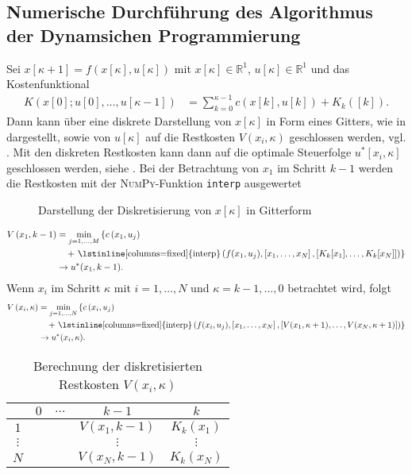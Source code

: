 \subsection{Numerische Durchführung des Algorithmus der Dynamsichen Programmierung}
Sei $x[\kappa+1] = f\left(x[\kappa],u[\kappa] \right)$ mit $x[\kappa]\in\mathbb{R}^1$, $u[\kappa]\in\mathbb{R}^1$ und das Kostenfunktional
\begin{align*}
	K\left(x[0];u[0],\ldots,u[\kappa-1] \right) & = \sum\limits_{k=0}^{\kappa-1}c\left(x[k],u[k] \right)+K_k([k]).
\end{align*}
Dann kann über eine diskrete Darstellung von $x[\kappa]$ in Form eines Gitters, wie in  dargestellt, sowie von
$u[\kappa]$ auf die Restkosten $V(x_i,\kappa)$ geschlossen werden, vgl. . Mit den diskreten Restkosten kann dann
auf die optimale Steuerfolge $u^{\ast}[x_i,\kappa]$ geschlossen werden, siehe . Bei der Betrachtung von $x_1$ im
Schritt $k-1$ werden die Restkosten mit der \textsc{NumPy}-Funktion \lstinline[columns=fixed]{interp} ausgewertet
\begin{figure}[!htb]
	\centering
	
	\caption{Darstellung der Diskretisierung von $x[\kappa]$ in Gitterform}
	\label{fig:kap_3_dyn_prog_xgitter}
\end{figure}
\begin{align*}
	V\left(x_1, k-1 \right) & = \min\limits_{j=1,\ldots,M} \left\{c\left(x_1,u_j \right)\right.\\
	& \quad + \left.\text{\lstinline[columns=fixed]{interp}}\left(f(x_1,u_j),\left[x_1,\ldots,x_N\right],\left[K_k[x_1],\ldots,K_k[x_N] \right] \right)
	\right\}\\
	& \rightarrow u^{\ast}(x_1,k-1).
\end{align*}
Wenn $x_i$ im Schritt $\kappa$ mit $i=1,\ldots,N$ und $\kappa=k-1,\ldots,0$ betrachtet wird, folgt
\begin{align*}
	V\left(x_i,\kappa \right) & = \min\limits_{j=1,\ldots,N}\left\{c\left(x_i,u_j \right)\right.\\
	&\quad + \left.\text{\lstinline[columns=fixed]{interp}}\left(f(x_i,u_j), \left[x_1,\ldots,x_N \right],\left[V(x_1,\kappa+1),\ldots,V(x_N,\kappa+1)
	\right] \right) \right\}\\
	& \rightarrow u^{\ast}(x_i,\kappa).
\end{align*}
\begin{table}[htb]
\caption{Berechnung der diskretisierten Restkosten $V(x_i,\kappa)$}
\centering
\begin{tabular}{|c|cccc|}
	\hline
	\diagbox{$i$}{$\kappa$} 	& $0$ 	& $\ldots$ 	& $k-1$ 		& $k$\\\hline
	$1$							&		&			& $V(x_1,k-1)$	& $K_k(x_1)$\\
	$\vdots$					&		&			& $\vdots$		& $\vdots$\\
	$N$							&		&			& $V(x_N,k-1)$	& $K_k(x_N)$\\\hline
\end{tabular}
\label{tab:kap_3_dyn_prog_restkosten}
\end{table}
